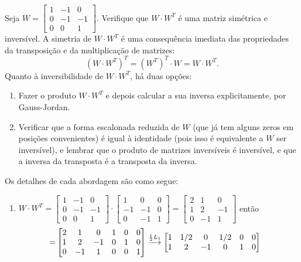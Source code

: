 \documentclass[12pt,a4paper]{article}
\newcommand{\grstep}[2][\relax]{%
   \ensuremath{\mathrel{
       {\mathop{\longrightarrow}\limits^{#2\mathstrut}_{
                                     \begin{subarray}{l} #1 \end{subarray}}}}}}
\begin{document}
\begin{ExerciseList}
\Exercise[title={1,8}] Seja $W =
\begin{bmatrix}
1 & -1 & 0 \\
0 & -1 & -1 \\
0 & 0 & 1
\end{bmatrix}$. Verifique que $W \cdot W^T$ é uma matriz simétrica e inversível.
\Answer A simetria de $W \cdot W^T$ é uma consequência imediata das propriedades da transposição e da multiplicação de matrizes:
\[
(W \cdot W^T)^T = (W^T)^T \cdot W = W \cdot W^T.
\]
Quanto à inversibilidade de $W \cdot W^T$, há duas opções:
\begin{enumerate}
\item Fazer o produto $W \cdot W^T$ e depois calcular a sua inversa explicitamente, por Gauss-Jordan.
\item Verificar que a forma escalonada reduzida de $W$ (que já tem alguns zeros em posições convenientes) é igual à identidade (pois isso é equivalente a $W$ ser inversível), e lembrar que o produto de matrizes inversíveis é inversível, e que a inversa da transposta é a transposta da inversa.
\end{enumerate}
Os detalhes de cada abordagem são como segue:
\begin{enumerate}
\item $W \cdot W^T
= \begin{bmatrix}
1 & -1 & 0 \\
0 & -1 & -1 \\
0 & 0 & 1
\end{bmatrix}
\cdot
\begin{bmatrix}
 1 & 0 & 0 \\
-1 & -1 & 0 \\
 0 & -1 & 1
\end{bmatrix}
= \begin{bmatrix}
2 & 1 & 0 \\
1 &  2 & -1 \\
0 & -1 &  1
\end{bmatrix}$ então
\begin{align*}
[ W \cdot W^T | I ] =
& \begin{bmatrix}
2 &  1 &  0 & 1 & 0 & 0 \\
1 &  2 & -1 & 0 & 1 & 0 \\
0 & -1 &  1 & 0 & 0 & 1
\end{bmatrix}
\grstep{ \frac{1}{2} L_1 }
\begin{bmatrix}
1 &  1/2 &  0 & 1/2 & 0 & 0 \\
1 &  2 & -1 & 0 & 1 & 0 \\

\end{bmatrix}
\end{align*}
\end{enumerate}
\end{ExerciseList}
\end{document}
